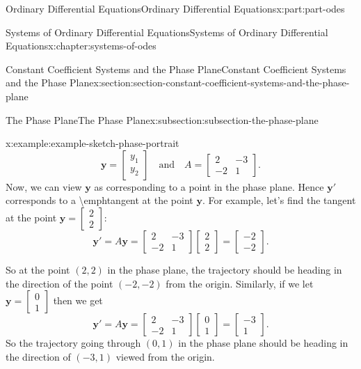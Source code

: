 \documentclass[oneside,10pt,]{book}
\numberwithin{equation}{part}
\renewcommand{\vec}[1]{\mathbf{#1}}
\newcommand{\amp}{&}
\begin{document}
\begin{partptx}{Ordinary Differential Equations}{}{Ordinary Differential Equations}{}{}{x:part:part-odes}
\begin{chapterptx}{Systems of Ordinary Differential Equations}{}{Systems of Ordinary Differential Equations}{}{}{x:chapter:systems-of-odes}
\begin{sectionptx}{Constant Coefficient Systems and the Phase Plane}{}{Constant Coefficient Systems and the Phase Plane}{}{}{x:section:section-constant-coefficient-systems-and-the-phase-plane}
\begin{subsectionptx}{The Phase Plane}{}{The Phase Plane}{}{}{x:subsection:subsection-the-phase-plane}
\begin{example}{}{x:example:example-sketch-phase-portrait}
\begin{equation*}
\vec{y} = \begin{bmatrix}y_{1}\\y_{2}\end{bmatrix}\quad\text{and}\quad A = \begin{bmatrix}2 \amp  -3 \\-2 \amp  1\end{bmatrix}.
\end{equation*}
Now, we can view \(\vec{y}\) as corresponding to a point in the phase plane. Hence \(\vec{y}'\) corresponds to a \textbackslash{}emph\textbraceleft{}tangent\textbraceright{} at the point \(\vec{y}\). For example, let's find the tangent at the point \(\vec{y} = \begin{bmatrix}2\\2\end{bmatrix}\):%
\begin{equation*}
\vec{y}' = A\vec{y} = \begin{bmatrix}2 \amp  -3 \\ -2 \amp  1\end{bmatrix}\begin{bmatrix}2\\2\end{bmatrix} = \begin{bmatrix}-2 \\ -2\end{bmatrix}.
\end{equation*}
%
\par
So at the point \((2,2)\) in the phase plane, the trajectory should be heading in the direction of the point \((-2,-2)\) from the origin. Similarly, if we let \(\vec{y} = \begin{bmatrix}0\\1\end{bmatrix}\) then we get%
\begin{equation*}
\vec{y}' = A\vec{y} = \begin{bmatrix}2 \amp  -3 \\ -2 \amp  1\end{bmatrix}\begin{bmatrix}0\\1\end{bmatrix} = \begin{bmatrix}-3 \\ 1\end{bmatrix}.
\end{equation*}
So the trajectory going through \((0,1)\) in the phase plane should be heading in the direction of \((-3,1)\) viewed from the origin.%

\end{example}
\end{subsectionptx}
\end{sectionptx}
\end{chapterptx}
\end{partptx}
\end{document}
